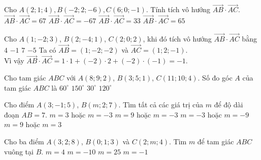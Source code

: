 \begin{ex}
	Cho $ A(2;1;4), B(-2;2;-6), C(6;0;-1) $. Tính tích vô hướng $ \vec{AB}\cdot \vec{AC} $.
	\choice
	{$\vec{AB}\cdot \vec{AC}=67$}
	{$\vec{AB}\cdot \vec{AC}=-67$}
	{\True$\vec{AB}\cdot \vec{AC}=33$}
	{$\vec{AB}\cdot \vec{AC}=65$}
\end{ex} 

\begin{ex}
	Cho $ A(1;-2; 3)$, $ B(2;-4; 1)$, $ C(2; 0; 2)$, khi đó tích vô hướng $\vec{AB}\cdot\vec{AC}$ bằng
	\choice
	{$4$}
	{\True $-1$}
	{$7$}
	{$-5$}
	\loigiai
	{
		Ta có $\vec{AB}=(1;-2;-2)$ và $\vec{AC}=(1; 2;-1)$.\\
		Vì vậy $\vec{AB}\cdot\vec{AC}=1\cdot 1+(-2)\cdot 2+(-2)\cdot (-1)=-1 $.
	}
\end{ex} 

\begin{ex}%
	Cho tam giác $ABC$ với $A(8; 9; 2)$, $B(3; 5; 1)$, $C(11; 10; 4)$. Số đo góc $A$ của tam giác $ABC$ là
	\choice
	{$60^\circ$}
	{\True $150^\circ$}
	{$30^\circ$}
	{$120^\circ$}
\end{ex} 

\begin{ex}
	Cho điểm $A(3;-1;5)$, $B(m;2;7)$. Tìm tất cả các giá trị của $m$ để độ dài đoạn $AB=7$.
	\choice
	{$m=3$ hoặc $m=-3$}
	{\True $m=9$ hoặc $m=-3$}
	{$m=-3$ hoặc $m=-9$}
	{$m=9$ hoặc $m=3$}
\end{ex} 



\begin{ex}
	Cho ba điểm $A(3;2;8)$, $B(0;1;3)$ và $C(2;m;4)$. Tìm $m$ để tam giác $ABC$ vuông tại $B$.
	\choice
	{$m=4$}
	{\True $m=-10$}
	{$m=25$}
	{$m=-1$}
\end{ex} 

